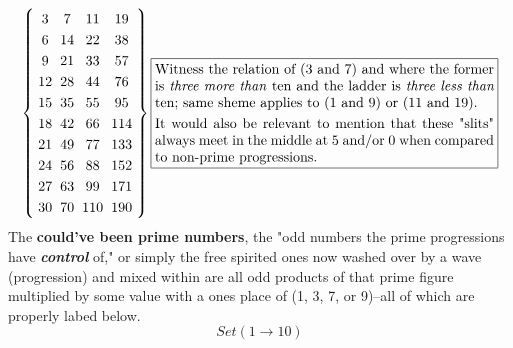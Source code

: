 \documentclass[12pt, letterpaper, twosided]{report}
\begin{document}
\[ 
\left \{
  \begin{tabular}{cccc}
  3    & 7    & 11    & 19  \\
  6    & 14  & 22    & 38  \\
  9    & 21  & 33    & 57  \\
  12  & 28  & 44    & 76  \\
  15  & 35  & 55    & 95  \\
  18  & 42  & 66    & 114\\
  21  & 49  & 77    & 133\\
  24  & 56  & 88    & 152\\
  27  & 63  & 99    & 171\\
  30  & 70  & 110  & 190
  \end{tabular}
\right \}
{\renewcommand{\arraystretch}{1.25}
\renewcommand{\tabcolsep}{0.1cm}
\begin{tabular}{|p{8.5cm}|}
\hline
Witness the relation of (3 and 7) and where the former
is \textit{three more than} ten and the ladder is 
\textit{three less than} ten; same sheme applies to
(1 and 9) or (11 and 19). \\
It would also be relevant to mention that these
"slits" always meet in the middle at 5 and/or 0 when
compared to non-prime progressions.\\
\hline
\end{tabular}}
\]
The \textbf{could've been prime numbers}, the "odd numbers the prime progressions have \textit{\textbf{control}} of," or simply the free spirited ones now washed over by a wave (progression) and mixed within are all odd products of that prime figure multiplied by some value with a ones place of (1, 3, 7, or 9)--all of which are properly labed below. \\
$$Set (1 \rightarrow 10)$$
\end{document}
